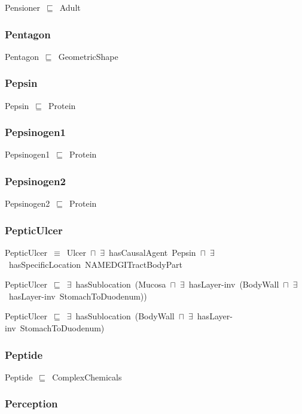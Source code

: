 \documentclass{article}
\begin{document}
Pensioner~\ensuremath{\sqsubseteq}~Adult~

\subsubsection*{Pentagon}

Pentagon~\ensuremath{\sqsubseteq}~GeometricShape~

\subsubsection*{Pepsin}

Pepsin~\ensuremath{\sqsubseteq}~Protein~

\subsubsection*{Pepsinogen1}

Pepsinogen1~\ensuremath{\sqsubseteq}~Protein~

\subsubsection*{Pepsinogen2}

Pepsinogen2~\ensuremath{\sqsubseteq}~Protein~

\subsubsection*{PepticUlcer}

PepticUlcer~\ensuremath{\equiv}~Ulcer~\ensuremath{\sqcap}~\ensuremath{\exists}~hasCausalAgent~Pepsin~\ensuremath{\sqcap}~\ensuremath{\exists}~hasSpecificLocation~NAMEDGITractBodyPart

PepticUlcer~\ensuremath{\sqsubseteq}~\ensuremath{\exists}~hasSublocation~(Mucosa~\ensuremath{\sqcap}~\ensuremath{\exists}~hasLayer-inv~(BodyWall~\ensuremath{\sqcap}~\ensuremath{\exists}~hasLayer-inv~StomachToDuodenum))~

PepticUlcer~\ensuremath{\sqsubseteq}~\ensuremath{\exists}~hasSublocation~(BodyWall~\ensuremath{\sqcap}~\ensuremath{\exists}~hasLayer-inv~StomachToDuodenum)~

\subsubsection*{Peptide}

Peptide~\ensuremath{\sqsubseteq}~ComplexChemicals~

\subsubsection*{Perception}
\end{document}
